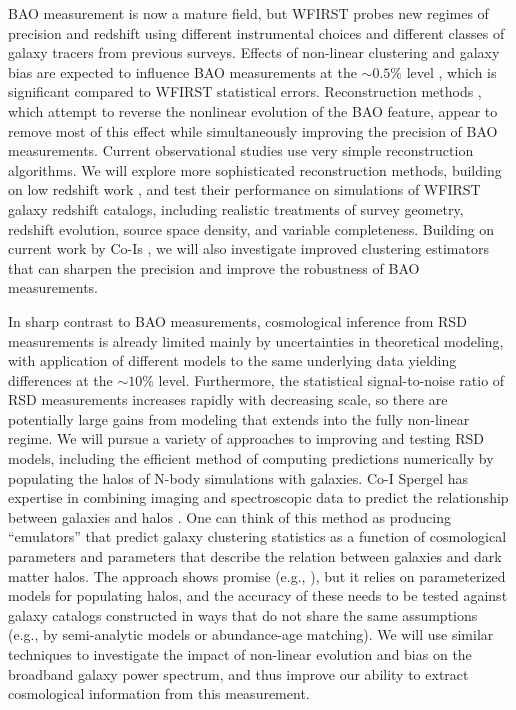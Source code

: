 BAO measurement is now a mature field, but WFIRST probes new regimes
of precision and redshift using different instrumental choices
and different classes of galaxy tracers from previous surveys.
Effects of non-linear clustering and galaxy bias are expected to
influence BAO measurements at the $\sim 0.5\%$ level \cite{Padmanabhan2009}, which is
significant compared to WFIRST statistical errors.
Reconstruction methods \cite{Eisenstein2007,Padmanabhan2012,Vargas2015},
which attempt to reverse the
nonlinear evolution of the BAO feature, appear to remove
most of this effect while simultaneously improving the precision
of BAO measurements.  Current observational studies use very simple
reconstruction algorithms.  We will explore more sophisticated
reconstruction methods, building on low redshift work \cite{Carrick15}, and test their performance on simulations
of WFIRST galaxy redshift catalogs, including realistic treatments of
survey geometry, redshift evolution, source space density, and
variable completeness.  Building on current work by Co-Is
\cite{Padmanabhan2012,Vargas2015,Osumi2015,Zhu2015},
we will also investigate improved clustering estimators that can sharpen the precision and improve the robustness
of BAO measurements.

In sharp contrast to BAO measurements, cosmological inference from
RSD measurements is already limited mainly by uncertainties in
theoretical modeling, with application of different models to the
same underlying data yielding differences at the $\sim 10\%$ level.
Furthermore, the statistical signal-to-noise ratio of RSD measurements
increases rapidly with decreasing scale, so there are potentially
large gains from modeling that extends into the fully non-linear regime.
We will pursue a variety of approaches to improving and testing
RSD models, including the
efficient method of computing predictions
numerically by populating the halos of N-body simulations with galaxies.
Co-I Spergel has expertise in combining imaging and spectroscopic
data to predict the relationship between galaxies and halos \cite{Hikage2012}.
One can think of this method as producing ``emulators'' \cite{Heitmann2014}
that predict galaxy clustering statistics as a function
of cosmological parameters and parameters that describe the relation
between galaxies and dark matter halos.
The approach shows promise (e.g., \cite{Reid2014}),
but it relies on parameterized models for populating halos,
and the accuracy of these needs to be tested against galaxy catalogs
constructed in ways that do not share the same assumptions
(e.g., by semi-analytic models or abundance-age matching).
We will use similar techniques to investigate the impact of
non-linear evolution and bias on the broadband galaxy power
spectrum, and thus improve our ability to extract cosmological
information from this measurement.

